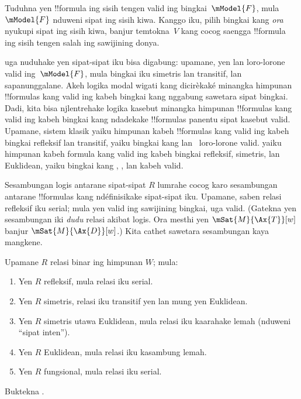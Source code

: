 \documentclass[../../../include/open-logic-section]{subfiles}
\begin{document}
\begin{prob}
Tuduhna yen !!{formula} ing sisih tengen
 valid ing bingkai~$\mModel{F}$,
mula $\mModel{F}$ nduweni sipat ing sisih kiwa. Kanggo iku, pilih
bingkai kang \emph{ora} nyukupi sipat ing sisih kiwa, banjur
temtokna~$V$ kang cocog saengga !!{formula} ing sisih tengen salah
ing sawijining donya.
\end{prob}

 uga nuduhake yen sipat-sipat
iku bisa digabung: upamane, yen  lan  loro-lorone valid
ing~$\mModel{F}$, mula bingkai iku simetris lan transitif, lan
sapanunggalane. Akeh logika modal wigati kang dicirèkaké minangka
himpunan !!{formula}s kang valid ing kabeh bingkai kang nggabung
sawetara sipat bingkai. Dadi, kita bisa njlentrehake logika kasebut
minangka himpunan !!{formula}s kang valid ing kabeh bingkai kang
ndadekake !!{formula}s panentu sipat kasebut valid. Upamane, sistem
klasik  yaiku himpunan kabeh !!{formula}s kang valid ing
kabeh bingkai refleksif lan transitif, yaiku bingkai kang 
lan~ loro-lorone valid.  yaiku himpunan kabeh formula
kang valid ing kabeh bingkai refleksif, simetris, lan Euklidean,
yaiku bingkai kang , , lan  kabeh valid.

Sesambungan logis antarane sipat-sipat $R$ lumrahe cocog
karo sesambungan antarane !!{formula}s kang ndéfinisikake sipat-sipat
iku. Upamane, saben relasi refleksif iku serial; mula yen 
valid ing sawijining bingkai,  uga valid. (Gatekna yen
sesambungan iki \emph{dudu} relasi akibat logis. Ora mesthi yen
$\mSat{M}{\Ax{T}}[w]$ banjur $\mSat{M}{\Ax{D}}[w]$.) Kita cathet
sawetara sesambungan kaya mangkene.

\begin{prop}
  Upamane $R$ relasi binar ing himpunan $W$; mula:
  \begin{enumerate}
  \item Yen $R$ refleksif, mula relasi iku serial.
  \item Yen $R$ simetris, relasi iku transitif yen lan mung yen
    Euklidean.
  \item Yen $R$ simetris utawa Euklidean, mula relasi iku kaarahake
    lemah (nduweni ``sipat inten'').
  \item Yen $R$ Euklidean, mula relasi iku kasambung lemah.
  \item Yen $R$ fungsional, mula relasi iku serial.
  \end{enumerate}
\end{prop}

\begin{prob}
  Buktekna .
\end{prob}
\end{document}
